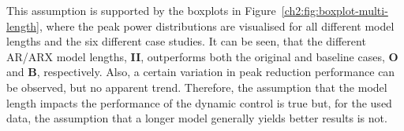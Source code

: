 This assumption is supported by the boxplots in Figure~\ref{ch2:fig:boxplot-multi-length}, where the peak power distributions are visualised for all different model lengths and the six different case studies.
It can be seen, that the different AR/ARX model lengths, \textbf{II}, outperforms both the original and baseline cases, \textbf{O} and \textbf{B}, respectively.
Also, a certain variation in peak reduction performance can be observed, but no apparent trend.
Therefore, the assumption that the model length impacts the performance of the dynamic control is true but, for the used data, the assumption that a longer model generally yields better results is not.



